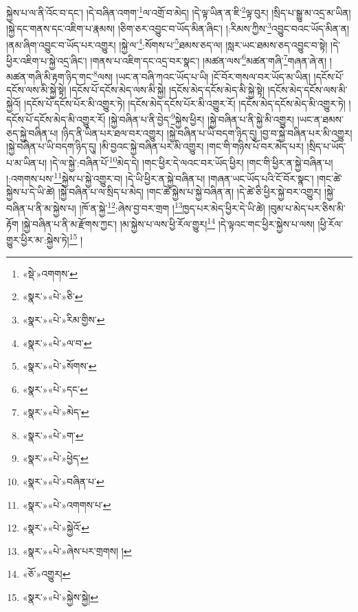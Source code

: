 སྐྱེས་པ་ལ་ནི་འོང་བ་དང་། །དེ་བཞིན་འགག་\footnote{«སྡེ་»འགགས་}ལ་འགྲོ་བ་མེད། །དེ་ལྟ་ཡིན་ན་ཇི་\footnote{«སྣར་»«པེ་»ཅི་}ལྟ་བུར། །སྲིད་པ་སྒྱུ་མ་འདྲ་མ་ཡིན། །སྐྱེ་དང་གནས་དང་འཇིག་པ་རྣམས། །ཅིག་ཅར་འབྱུང་བ་ཡོད་མིན་ཞིང་། །:རིམས་ཀྱིས་\footnote{«སྣར་»«པེ་»རིམ་གྱིས་}འབྱུང་བའང་ཡོད་མིན་ན། །ནམ་ཞིག་འབྱུང་བ་ཡོད་པར་འགྱུར། །སྐྱེ་ལ་\footnote{«སྣར་»«པེ་»ལ་བ་}:སོགས་པ་\footnote{«སྣར་»«པེ་»སོགས་}ཐམས་ཅད་ལ། །སླར་ཡང་ཐམས་ཅད་འབྱུང་བ་སྟེ། །དེ་ཕྱིར་འཇིག་པ་སྐྱེ་འདྲ་ཞིང་། །གནས་པ་འཇིག་དང་འདྲ་བར་སྣང་། །མཚན་ལས་\footnote{«སྣར་»«པེ་»དང་}མཚན་གཞི་\footnote{«སྣར་»«པེ་»མེད་}གཞན་ཞེ་ན། །མཚན་གཞི་མི་རྟག་ཉིད་གང་\footnote{«སྣར་»«པེ་»ག་}ལས། །ཡང་ན་བཞི་ཀའང་ཡོད་པ་ཡི། །ངོ་བོར་གསལ་བར་ཡོད་མ་ཡིན། །དངོས་པོ་དངོས་ལས་མི་སྐྱེ་སྟེ། །དངོས་པོ་དངོས་མེད་ལས་མི་སྐྱེ། །དངོས་མེད་དངོས་མེད་མི་སྐྱེ་སྟེ། །དངོས་མེད་དངོས་ལས་མི་སྐྱེའོ། །དངོས་པོ་དངོས་པོར་མི་འགྱུར་ཏེ། །དངོས་མེད་དངོས་པོར་མི་འགྱུར་རོ། །དངོས་མེད་དངོས་མེད་མི་འགྱུར་ཏེ། །དངོས་པོ་དངོས་མེད་མི་འགྱུར་རོ། །སྐྱེ་བཞིན་པ་ནི་བྱེད་\footnote{«སྣར་»«པེ་»ཕྱེད་}སྐྱེས་ཕྱིར། །སྐྱེ་བཞིན་པ་ནི་སྐྱེ་མི་འགྱུར། །ཡང་ན་ཐམས་ཅད་སྐྱེ་བཞིན་པ། །ཉིད་ནི་ཡིན་པར་ཐལ་བར་འགྱུར། །སྐྱེ་བཞིན་པ་ཡི་བདག་ཉིད་དུ། །བྱ་བ་སྐྱེ་བཞིན་པར་མི་འགྱུར། །སྐྱེ་བཞིན་པ་ཡི་བདག་ཉིད་དུ། །མི་བྱའང་སྐྱེ་བཞིན་པར་མི་འགྱུར། །གང་གི་གཉིས་པོ་བར་མེད་པར། །སྲིད་པ་ཡོད་པ་མ་ཡིན་པ། །དེ་ལ་སྐྱེ་:བཞིན་པོ་\footnote{«སྣར་»«པེ་»བཞིན་པ་}མེད་དེ། །གང་ཕྱིར་དེ་ལའང་བར་ཡོད་ཕྱིར། །གང་གི་ཕྱིར་ན་སྐྱེ་བཞིན་པ། །:འགགས་པས་\footnote{«སྣར་»«པེ་»འགགས་པ་}སྐྱེས་པ་སྐྱེ་འགྱུར་བ། །དེ་ཡི་ཕྱིར་ན་སྐྱེ་བཞིན་པ། །གཞན་ཡང་ཡོད་པའི་ངོ་བོར་སྣང་། །གང་ཚེ་སྐྱེས་པ་དེ་ཡི་ཚེ། །སྐྱེ་བཞིན་པ་ལ་སྲིད་པ་མེད། །གང་ཚེ་སྐྱེས་པ་སྐྱེ་བཞིན་ན། །དེ་ཚེ་ཅི་ཕྱིར་སྐྱེ་བར་འགྱུར། །སྐྱེ་བཞིན་པ་ནི་མ་སྐྱེས་པ། །ཁོ་ན་སྐྱེ་\footnote{«སྣར་»«པེ་»སྐྱེའོ་}:ཞེས་བྱ་བར་གྲག །\footnote{«སྣར་»«པེ་»ཞེས་པར་གྲགས། །}ཁྱད་པར་མེད་ཕྱིར་དེ་ཡི་ཚེ། །བུམ་པ་མེད་པར་ཅིས་མི་རྟོག །སྐྱེ་བཞིན་པ་ནི་མ་རྫོགས་ཀྱང་། །མ་སྐྱེས་པ་ལས་ཕྱི་རོལ་གྱུར།\footnote{«ཅོ་»འགྱུར།} །དེ་ལྟའང་གང་ཕྱིར་སྐྱེས་པ་ལས། །ཕྱི་རོལ་གྱུར་ཕྱིར་མ་:སྐྱེས་ཏེ།\footnote{«སྣར་»«པེ་»སྐྱེས་སྐྱེ།} །
